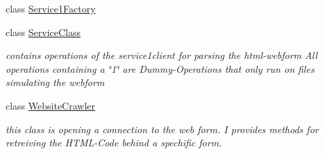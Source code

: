 \begin{DoxyCompactItemize}
class \hyperlink{class_wcf_service1_1_1_service1_factory}{Service1\+Factory}
\item 
class \hyperlink{class_wcf_service1_1_1_service_class}{Service\+Class}
\begin{DoxyCompactList}\small\item\em contains operations of the service1client for parsing the html-\/webform All operations containing a \char`\"{}1\char`\"{} are Dummy-\/\+Operations that only run on files simulating the webform \end{DoxyCompactList}\item 
class \hyperlink{class_wcf_service1_1_1_website_crawler}{Website\+Crawler}
\begin{DoxyCompactList}\small\item\em this class is opening a connection to the web form. I provides methods for retreiving the H\+T\+M\+L-\/\+Code behind a spechific form. \end{DoxyCompactList}\end{DoxyCompactItemize}
